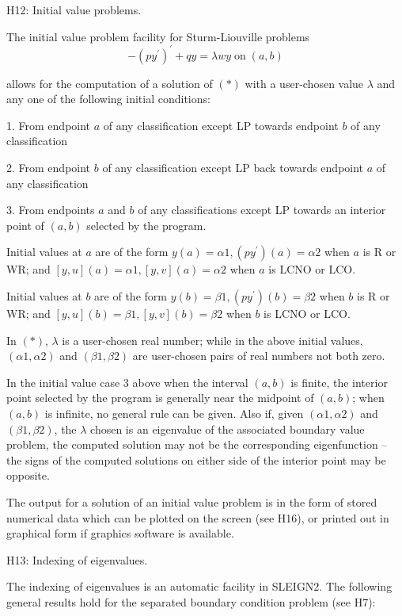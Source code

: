 \documentclass[12pt]{amsart}%
\theoremstyle{plain}
\numberwithin{equation}{section}
\numberwithin{theorem}{section}
\begin{document}
\medskip

H12: Initial value problems.

The initial value problem facility for Sturm-Liouville problems%
\begin{equation}
-(py^{\prime})^{\prime}+qy=\lambda wy\;\text{on}\;(a,b) \tag{*}%
\end{equation}

\noindent allows for the computation of a solution of $(\ast)$ with a
user-chosen value $\lambda$ and any one of the following initial conditions:

1. From endpoint $a$ of any classification except LP towards endpoint $b$ of
any classification

2. From endpoint $b$ of any classification except LP back towards endpoint $a$
of any classification

3. From endpoints $a$ and $b$ of any classifications except LP towards an
interior point of $(a,b)$ selected by the program.

Initial values at $a$ are of the form $y(a)=\alpha1,(py^{\prime})(a)=\alpha2$
when $a$ is R or WR; and $[y,u](a)=\alpha1,[y,v](a)=\alpha2$ when $a$ is LCNO
or LCO.

Initial values at $b$ are of the form $y(b)=\beta1,(py^{\prime})(b)=\beta2$
when $b$ is R or WR; and $[y,u](b)=\beta1,[y,v](b)=\beta2$ when $b$ is LCNO or LCO.

In $(\ast)$, $\lambda$ is a user-chosen real number; while in the above
initial values, $(\alpha1,\alpha2)$ and $(\beta1,\beta2)$ are user-chosen
pairs of real numbers not both zero.

In the initial value case 3 above when the interval $(a,b)$ is finite, the
interior point selected by the program is generally near the midpoint of
$(a,b)$; when $(a,b)$ is infinite, no general rule can be given. Also if,
given $(\alpha1,\alpha2)$ and $(\beta1,\beta2)$, the $\lambda$ chosen is an
eigenvalue of the associated boundary value problem, the computed solution may
not be the corresponding eigenfunction -- the signs of the computed solutions
on either side of the interior point may be opposite.

The output for a solution of an initial value problem is in the form of stored
numerical data which can be plotted on the screen (see H16), or printed out in
graphical form if graphics software is available.

\medskip

H13: Indexing of eigenvalues.

The indexing of eigenvalues is an automatic facility in SLEIGN2. The following
general results hold for the separated boundary condition problem (see H7):
\end{document}
